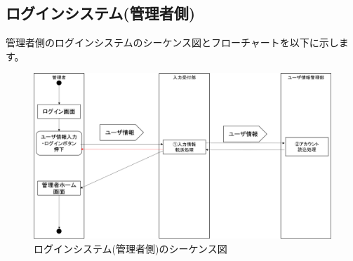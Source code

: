 \newpage

\subsection{ログインシステム(管理者側)}
管理者側のログインシステムのシーケンス図とフローチャートを以下に示します。

\begin{figure}[htbp]
  \begin{center}
    \includegraphics[width=1\linewidth,clip]{./img/admin_login/main.png}
    \caption{ログインシステム(管理者側)のシーケンス図}\label{fig:adminloginseaquence}
  \end{center}
\end{figure}


